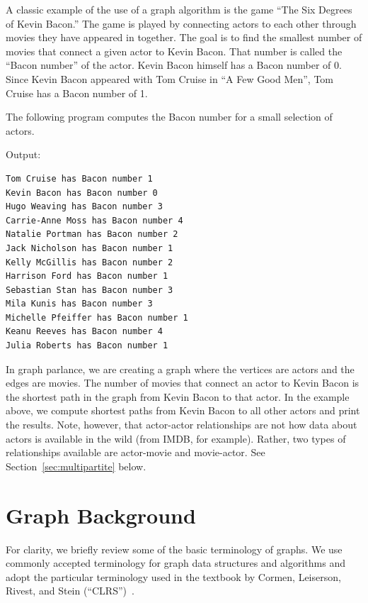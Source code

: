 A classic example of the use of a graph algorithm is the game ``The Six Degrees of Kevin Bacon.''
The game is played by connecting actors to each other through movies they have appeared in together.
The goal is to find the smallest number of movies that connect a given actor to Kevin Bacon.
That number is called the ``Bacon number'' of the actor. Kevin Bacon himself has a Bacon number of 0.
Since Kevin Bacon appeared with Tom Cruise in ``A Few Good Men'', Tom Cruise has a Bacon number of 1.

The following program computes the Bacon number for a small selection of actors.

{\small
  
}


\noindent
Output:
\begin{lstlisting}
Tom Cruise has Bacon number 1
Kevin Bacon has Bacon number 0
Hugo Weaving has Bacon number 3
Carrie-Anne Moss has Bacon number 4
Natalie Portman has Bacon number 2
Jack Nicholson has Bacon number 1
Kelly McGillis has Bacon number 2
Harrison Ford has Bacon number 1
Sebastian Stan has Bacon number 3
Mila Kunis has Bacon number 3
Michelle Pfeiffer has Bacon number 1
Keanu Reeves has Bacon number 4
Julia Roberts has Bacon number 1    
\end{lstlisting}  


In graph parlance, we are creating a graph where the vertices are actors and the edges are movies.
The number of movies that connect an actor to Kevin Bacon is the shortest path in the graph
from Kevin Bacon to that actor. In the example above, we compute shortest paths from Kevin
Bacon to all other actors and print the results.
Note, however, that actor-actor relationships are not how data about actors
is available in the wild (from IMDB, for example).  Rather, two types of  relationships available are actor-movie and movie-actor.  See Section~\ref{sec:multipartite} below.


\section{Graph Background} %

For clarity, we briefly review some of the basic terminology of graphs.
We use commonly accepted terminology for graph data structures and algorithms and
adopt the particular terminology used in the textbook by
Cormen, Leiserson, Rivest, and Stein (``CLRS'')~\cite{CLRS2022}.

